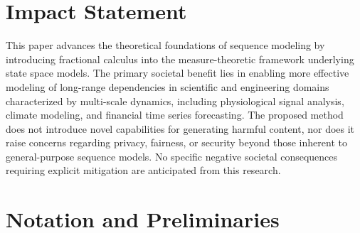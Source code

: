 \documentclass{article}
\theoremstyle{plain}
\theoremstyle{definition}
\theoremstyle{remark}
\begin{document}
\section*{Impact Statement}

This paper advances the theoretical foundations of sequence modeling by introducing fractional calculus into the measure-theoretic framework underlying state space models. The primary societal benefit lies in enabling more effective modeling of long-range dependencies in scientific and engineering domains characterized by multi-scale dynamics, including physiological signal analysis, climate modeling, and financial time series forecasting. The proposed method does not introduce novel capabilities for generating harmful content, nor does it raise concerns regarding privacy, fairness, or security beyond those inherent to general-purpose sequence models. No specific negative societal consequences requiring explicit mitigation are anticipated from this research.





\newpage
\appendix
\onecolumn

\section{Notation and Preliminaries}
\label{app:notation}
\end{document}
